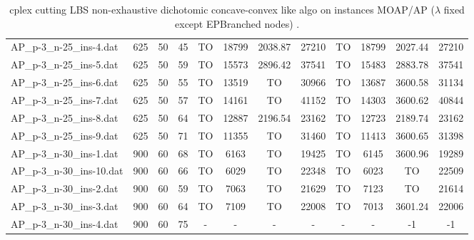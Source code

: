\begin{sidewaystable}[!ht]
{\begin{tabular}{lccccccccccc}
AP\_p-3\_n-25\_ins-4.dat & 625 & 50 & 45 &  TO & 18799 & 2038.87 & 27210 &  TO & 18799 & 2027.44 & 27210 \\
AP\_p-3\_n-25\_ins-5.dat & 625 & 50 & 59 &  TO & 15573 & 2896.42 & 37541 &  TO & 15483 & 2883.78 & 37541 \\
AP\_p-3\_n-25\_ins-6.dat & 625 & 50 & 55 &  TO & 13519 &  TO & 30966 &  TO & 13687 &  \textcolor{blue2}{3600.58} & 31134 \\
AP\_p-3\_n-25\_ins-7.dat & 625 & 50 & 57 &  TO & 14161 &  TO & 41152 &  TO & 14303 &  \textcolor{blue2}{3600.62} & 40844 \\
AP\_p-3\_n-25\_ins-8.dat & 625 & 50 & 64 &  TO & 12887 & 2196.54 & 23162 &  TO & 12723 & 2189.74 & 23162 \\
AP\_p-3\_n-25\_ins-9.dat & 625 & 50 & 71 &  TO & 11355 &  TO & 31460 &  TO & 11413 &  \textcolor{blue2}{3600.65} & 31398 \\
AP\_p-3\_n-30\_ins-1.dat & 900 & 60 & 68 &  TO & 6163 &  TO & 19425 &  TO & 6145 &  \textcolor{blue2}{3600.96} & 19289 \\
AP\_p-3\_n-30\_ins-10.dat & 900 & 60 & 66 &  TO & 6029 &  TO & 22348 &  TO & 6023 &  TO & 22509 \\
AP\_p-3\_n-30\_ins-2.dat & 900 & 60 & 59 &  TO & 7063 &  TO & 21629 &  TO & 7123 &  TO & 21614 \\
AP\_p-3\_n-30\_ins-3.dat & 900 & 60 & 64 &  TO & 7109 &  TO & 22008 &  TO & 7013 &  \textcolor{blue2}{3601.24} & 22006 \\
AP\_p-3\_n-30\_ins-4.dat & 900 & 60 & 75 &  - &  - &  - &  - &  - &  - & -1 & -1 \\
\bottomrule
\end{tabular}
}%
\caption{cplex cutting LBS non-exhaustive dichotomic concave-convex like algo on instances MOAP/AP ($\lambda$ fixed except EPBranched nodes) .}
\end{sidewaystable}
